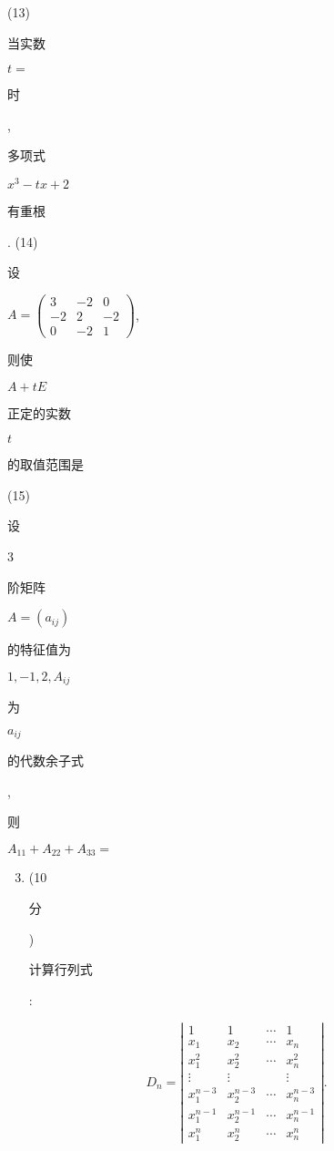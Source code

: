\documentclass[10pt]{article}
\begin{document}
(13) \begin{CJK}{UTF8}{mj}当实数\end{CJK} $t=$ \begin{CJK}{UTF8}{mj}时\end{CJK}, \begin{CJK}{UTF8}{mj}多项式\end{CJK} $x^{3}-t x+2$ \begin{CJK}{UTF8}{mj}有重根\end{CJK}. (14) \begin{CJK}{UTF8}{mj}设\end{CJK} $A=\left(\begin{array}{ccc}3 & -2 & 0 \\ -2 & 2 & -2 \\ 0 & -2 & 1\end{array}\right)$, \begin{CJK}{UTF8}{mj}则使\end{CJK} $A+t E$ \begin{CJK}{UTF8}{mj}正定的实数\end{CJK} $t$ \begin{CJK}{UTF8}{mj}的取值范围是\end{CJK}

(15) \begin{CJK}{UTF8}{mj}设\end{CJK} 3 \begin{CJK}{UTF8}{mj}阶矩阵\end{CJK} $A=\left(a_{i j}\right)$ \begin{CJK}{UTF8}{mj}的特征值为\end{CJK} $1,-1,2, A_{i j}$ \begin{CJK}{UTF8}{mj}为\end{CJK} $a_{i j}$ \begin{CJK}{UTF8}{mj}的代数余子式\end{CJK}, \begin{CJK}{UTF8}{mj}则\end{CJK} $A_{11}+A_{22}+A_{33}=$

\begin{enumerate}
  \setcounter{enumi}{2}
  \item (10 \begin{CJK}{UTF8}{mj}分\end{CJK}) \begin{CJK}{UTF8}{mj}计算行列式\end{CJK}:
\end{enumerate}
$$
D_{n}=\left|\begin{array}{cccc}
1 & 1 & \cdots & 1 \\
x_{1} & x_{2} & \cdots & x_{n} \\
x_{1}^{2} & x_{2}^{2} & \cdots & x_{n}^{2} \\
\vdots & \vdots & & \vdots \\
x_{1}^{n-3} & x_{2}^{n-3} & \cdots & x_{n}^{n-3} \\
x_{1}^{n-1} & x_{2}^{n-1} & \cdots & x_{n}^{n-1} \\
x_{1}^{n} & x_{2}^{n} & \cdots & x_{n}^{n}
\end{array}\right| .
$$
\end{document}
